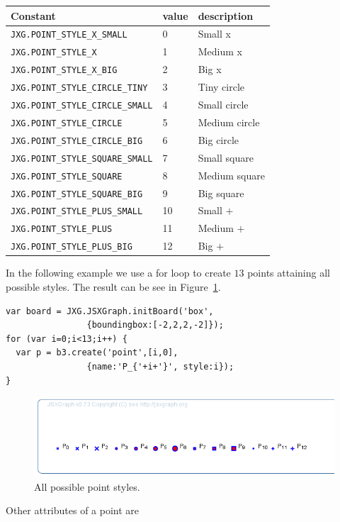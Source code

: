 \bigskip
\begin{center}
\footnotesize
\begin{tabular}{lll}
\toprule
Constant &    value   & description \\
\midrule
\lstinline|JXG.POINT_STYLE_X_SMALL| &     0  & Small x \\
\lstinline|JXG.POINT_STYLE_X|  & 1&   Medium x \\
\lstinline|JXG.POINT_STYLE_X_BIG|  & 2  & Big x \\
\lstinline|JXG.POINT_STYLE_CIRCLE_TINY|  &   3 &  Tiny circle \\
\lstinline|JXG.POINT_STYLE_CIRCLE_SMALL|  &  4  & Small circle \\
\lstinline|JXG.POINT_STYLE_CIRCLE| & 5 &  Medium circle \\
\lstinline|JXG.POINT_STYLE_CIRCLE_BIG| & 6  & Big circle \\
\lstinline|JXG.POINT_STYLE_SQUARE_SMALL|&   7&   Small square \\
\lstinline|JXG.POINT_STYLE_SQUARE|&  8  & Medium square \\
\lstinline|JXG.POINT_STYLE_SQUARE_BIG|&  9 &  Big square \\
\lstinline|JXG.POINT_STYLE_PLUS_SMALL|&  10 & Small $+$ \\
\lstinline|JXG.POINT_STYLE_PLUS|&   11  &Medium $+$ \\
\lstinline|JXG.POINT_STYLE_PLUS_BIG| &   12  &Big $+$ \\
\bottomrule
\end{tabular}
\end{center}
In the following example we use a for loop to create $13$ points attaining all possible styles. The result can be see in Figure~\ref{fig:4}.
\begin{lstlisting}
var board = JXG.JSXGraph.initBoard('box', 
                {boundingbox:[-2,2,2,-2]});
for (var i=0;i<13;i++) {
  var p = b3.create('point',[i,0], 
                {name:'P_{'+i+'}', style:i});
}
\end{lstlisting}
\begin{figure}[h]
\includegraphics[width=0.4\linewidth]{images/b5.png}
\caption{All possible point styles.}\label{fig:4}
\end{figure}
Other attributes of a point are
\bigskip
